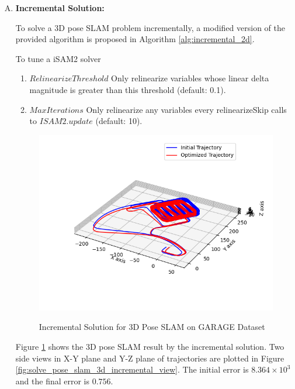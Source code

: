 \documentclass[11pt, oneside, letter]{article}
\begin{document}
\begin{enumerate}[A.]
\item \textbf{Incremental Solution:}

To solve a 3D pose SLAM problem incrementally, a modified version of the provided algorithm is proposed in Algorithm \ref{alg:incremental_2d}.

To tune a iSAM2 solver
\begin{enumerate}[1.]
    \item $RelinearizeThreshold$ Only relinearize variables whose linear delta magnitude is greater than this threshold (default: 0.1).
    \item $MaxIterations$ Only relinearize any variables every relinearizeSkip calls to $ISAM2.update$  (default: 10).
\end{enumerate}

\begin{figure}[H]
    \centering
        \textsf{\includegraphics[width=0.65\columnwidth]{../figures/solve_pose_slam_3d_incremental.png}}
        \caption{Incremental Solution for 3D Pose SLAM on GARAGE Dataset}
        \label{fig:solve_pose_slam_3d_incremental}
\end{figure}

Figure \ref{fig:solve_pose_slam_3d_incremental} shows the 3D pose SLAM result by the incremental solution. 
Two side views in X-Y plane and Y-Z plane of trajectories are plotted in Figure \ref{fig:solve_pose_slam_3d_incremental_view}.
The initial error is $8.364\times 10^3$ and the final error is $0.756$.


\end{enumerate}
\end{document}
